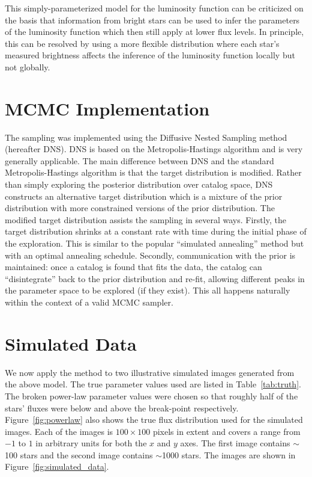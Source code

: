 \documentclass[manuscript]{aastex}
\begin{document}
This simply-parameterized model for the luminosity function can be criticized
on the basis that information from bright stars can be used to infer the
parameters of the luminosity function which then still apply at lower flux
levels. In principle, this can be resolved by using a more flexible distribution
\citep[e.g.][]{2008ApJ...682..874K} where each star's measured brightness
affects the inference of the luminosity function locally but not globally.
 
\section{MCMC Implementation}
The sampling was implemented using the Diffusive Nested Sampling \citep{dnest}
method (hereafter DNS). DNS is based on the Metropolis-Hastings algorithm and
is very generally applicable. The main difference between DNS and the standard
Metropolis-Hastings algorithm is that the target distribution is modified.
Rather than simply exploring the posterior distribution over catalog space,
DNS constructs an alternative target distribution which is a mixture of the
prior distribution with more constrained versions of the prior distribution.
The modified target distribution assists the sampling in several ways.
Firstly, the target distribution shrinks at a constant rate with time during the
initial phase of the exploration. This is similar to the popular ``simulated
annealing'' method but with an optimal annealing schedule. Secondly,
communication with the prior is maintained: once a catalog is found that
fits the data, the catalog can ``disintegrate'' back to the prior distribution
and re-fit, allowing different peaks in the parameter space to be explored
(if they exist). This all happens naturally within the context of a valid
MCMC sampler.

\section{Simulated Data}\label{sec:simulated_data}
We now apply the method to two illustrative simulated images generated from
the above model. The true parameter values used are listed in
Table~\ref{tab:truth}. The broken power-law parameter values were chosen so that
roughly half of the stars' fluxes were below and above the break-point
respectively. Figure~\ref{fig:powerlaw} also shows the true flux distribution
used for the simulated images. Each of the images
is $100 \times 100$ pixels in extent and covers a range from $-1$ to $1$ in
arbitrary units for both the $x$ and $y$ axes. The first image contains
$\sim$100 stars and the second image contains $\sim$1000 stars. The images
are shown in Figure~\ref{fig:simulated_data}.
\end{document}
